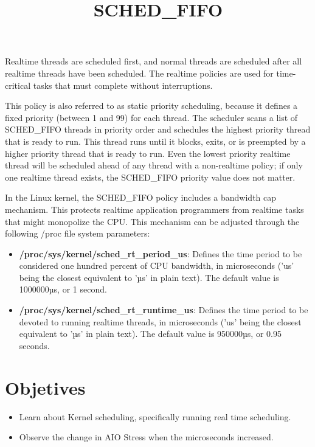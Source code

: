 \documentclass[a4paper]{article}
\begin{document}
Realtime threads are scheduled first, and normal threads are scheduled after all realtime threads have been scheduled.
The realtime policies are used for time-critical tasks that must complete without interruptions.

\setlength{\parskip}{5mm}

\title{SCHED\_FIFO}

This policy is also referred to as static priority scheduling, because it defines a fixed priority (between 1 and 99) for each thread. The scheduler scans a list of SCHED\_FIFO threads in priority order and schedules the highest priority thread that is ready to run. This thread runs until it blocks, exits, or is preempted by a higher priority thread that is ready to run.
Even the lowest priority realtime thread will be scheduled ahead of any thread with a non-realtime policy; if only one realtime thread exists, the SCHED\_FIFO priority value does not matter.

\setlength{\parskip}{5mm}

In the Linux kernel, the SCHED\_FIFO policy includes a bandwidth cap mechanism. This protects realtime application programmers from realtime tasks that might monopolize the CPU. This mechanism can be adjusted through the following /proc file system parameters:

\setlength{\parskip}{5mm}

\begin{itemize}

\item \textbf{/proc/sys/kernel/sched\_rt\_period\_us}: Defines the time period to be considered one hundred percent of CPU bandwidth, in microseconds ('us' being the closest equivalent to 'µs' in plain text). The default value is 1000000µs, or 1 second.

\item \textbf{/proc/sys/kernel/sched\_rt\_runtime\_us}: Defines the time period to be devoted to running realtime threads, in microseconds ('us' being the closest equivalent to 'µs' in plain text). The default value is 950000µs, or 0.95 seconds.
\end{itemize}

\section {Objetives}
\begin{itemize}
\item Learn about Kernel scheduling, specifically running real time scheduling. 
\item Observe the change in AIO Stress when the microseconds increased. 
\end{itemize}
\end{document}
